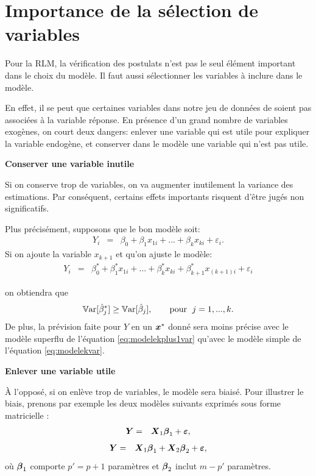 \newpage
\section{Importance de la sélection de variables}

Pour la RLM, la vérification des postulats n'est pas le seul élément important dans le choix du modèle. Il faut aussi sélectionner les variables à inclure dans le modèle.

En effet, il se peut que certaines variables dans notre jeu de données de soient pas associées à la variable réponse.
En présence d'un grand nombre de variables exogènes, on court deux dangers: enlever une variable qui est utile pour expliquer la variable endogène, et conserver dans le modèle une variable qui n'est pas utile.

\textbf{Conserver une variable inutile}

Si on conserve trop de variables, on va augmenter inutilement la variance des estimations. Par conséquent, certains effets importants risquent d'être jugés non significatifs.

Plus précisément, supposons que le bon modèle soit:
\begin{eqnarray}
Y_i &=& \beta_0+\beta_1 x_{1i}+...+\beta_k x_{ki}+ \varepsilon_i.
\label{eq:modelekvar}
\end{eqnarray}
Si on ajoute la variable $x_{k+1}$ et qu'on ajuste le modèle:
\begin{eqnarray}
\label{eq:modelekplus1var}
  Y_i &=& \beta_0^*+\beta_1^* x_{1i}+...+\beta_k^* x_{ki}+ \beta_{k+1}^* x_{(k+1)i}+ \varepsilon_i
\end{eqnarray}

on obtiendra que $$\mathbb{V}\text{ar}[\hat\beta^*_j] \geq \mathbb{V}\text{ar}[\hat\beta_j],\qquad\text{pour } \;j=1,...,k.$$
De plus, la prévision faite pour $Y$ en un $\mbox{\boldmath$x$\unboldmath}^*$ donné sera moins précise avec le modèle superflu de l'équation \eqref{eq:modelekplus1var} qu'avec le modèle simple de l'équation \eqref{eq:modelekvar}.

\textbf{Enlever une variable utile}

À l'opposé, si on enlève trop de variables, le modèle sera biaisé. Pour illustrer le biais, prenons par exemple les deux modèles suivants exprimés sous forme matricielle :
\begin{eqnarray}
  \mbox{\boldmath$Y$\unboldmath} &=& \mbox{\boldmath$X$\unboldmath}_1\mbox{\boldmath$\beta$}_1 + \mbox{\boldmath$\varepsilon$\unboldmath},
  \label{eq:1parametre}
  \end{eqnarray}
  \begin{eqnarray}
  \mbox{\boldmath$Y$\unboldmath} &=& \mbox{\boldmath$X$\unboldmath}_1\mbox{\boldmath$\beta$}_1 +\mbox{\boldmath$X$\unboldmath}_2\mbox{\boldmath$\beta$}_2 +\mbox{\boldmath$\varepsilon$\unboldmath},
  \label{eq:2parametres}
\end{eqnarray}
où $\mbox{\boldmath$\beta$}_1$ comporte $p'=p+1$ paramètres et $\mbox{\boldmath$\beta$}_2$ inclut $m-p'$ paramètres.

